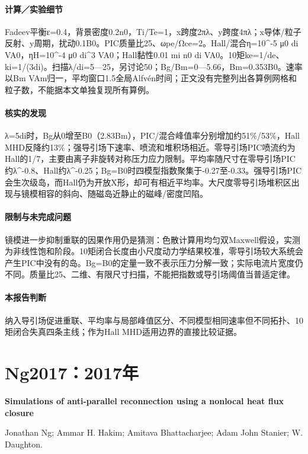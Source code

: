\documentclass[UTF8,a4paper,11pt,openany,fontset=fandol]{ctexbook}
\begin{document}
\paragraph{计算／实验细节}Fadeev平衡ε=0.4，背景密度0.2n0，Ti/Te=1，x跨度2πλ、y跨度4πλ；x导体/粒子反射、y周期，扰动0.1B0。PIC质量比25、ωpe/Ωce=2。Hall/混合η=10\textasciicircum{}-5 μ0 di VA0，ηH=10\textasciicircum{}-4 μ0 di\textasciicircum{}3 VA0；Hall黏性0.01 mi n0 di VA0。10矩ke=1/de、ki=1/(3di)。扫描λ/di=5—25，另讨论50；Bg/Bm=0—5.66，Bm=0.353B0。速率以Bm VAm归一，平均窗口1.5全局Alfvén时间；正文没有完整列出各算例网格和粒子数，不能据本文单独复现所有算例。

\paragraph{核实的发现}λ=5di时，Bg从0增至B0（2.83Bm），PIC/混合峰值率分别增加约51\%/53\%，Hall MHD反降约13\%；强导引场下速率、喷流和堆积场相近。零导引场PIC喷流约为Hall的1/7，主要由离子非旋转对称压力应力限制。平均率随尺寸在零导引场PIC约λ\textasciicircum{}-0.8、Hall约λ\textasciicircum{}-0.25；Bg=B0时四模型指数聚集于-0.27至-0.33。强导引场PIC会生次级岛，而Hall仍为开放X形，却可有相近平均率。大尺度零导引场堆积区出现与镜模相容的斜向、随磁岛近静止的磁峰/密度凹陷。

\paragraph{限制与未完成问题}镜模进一步抑制重联的因果作用仍是猜测：色散计算用均匀双Maxwell假设，实测为非线性饱和阶段。10矩闭合长度由小尺度动力学结果校准，零导引场较大系统会产生PIC中没有的岛。Bg=B0的定量一致不表示压力分解一致；实际电流片宽度仍不同。质量比25、二维、有限尺寸扫描，不能把指数或导引场阈值当普适定律。

\paragraph{本报告判断}纳入导引场促进重联、平均率与局部峰值区分、不同模型相同速率但不同拓扑、10矩闭合失真四条主线；作为Hall MHD适用边界的直接比较证据。

\section{Ng2017：2017年}\label{paper:Ng2017}

\textbf{Simulations of anti-parallel reconnection using a nonlocal heat flux closure}\citep{Ng2017}\

Jonathan Ng;  Ammar H. Hakim;  Amitava Bhattacharjee;  Adam  John Stanier;  W. Daughton.
\end{document}
